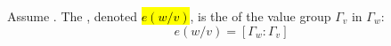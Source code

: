 \begin{definition} \label{definition:ramification_index_of_extension_of_valuation_fields}
    Assume . The , denoted \hl{$e(w/v)$}, is the  of the value group $\Gamma_v$ in $\Gamma_w$:
    $$e(w/v) = [\Gamma_w: \Gamma_v]$$
\end{definition}